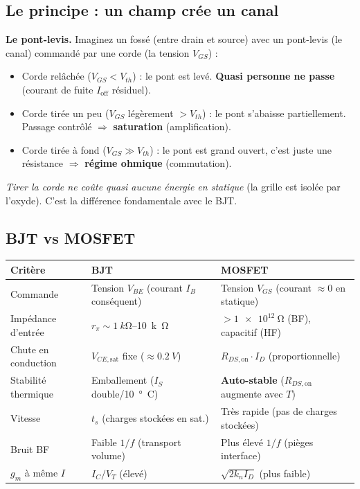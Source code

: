 \documentclass[12pt,a4paper,twoside]{book}
\begin{document}
\subsection{Le principe : un champ crée un canal}

\begin{analogie}
\textbf{Le pont-levis.} Imaginez un fossé (entre drain et source) avec un pont-levis (le canal) commandé par une corde (la tension $V_{GS}$) :
\begin{itemize}[nosep]
\item Corde relâchée ($V_{GS} < V_{th}$) : le pont est levé. \textbf{Quasi personne ne passe} (courant de fuite $I_{\text{off}}$ résiduel).
\item Corde tirée un peu ($V_{GS}$ légèrement $> V_{th}$) : le pont s'abaisse partiellement. Passage contrôlé $\Rightarrow$ \textbf{saturation} (amplification).
\item Corde tirée à fond ($V_{GS} \gg V_{th}$) : le pont est grand ouvert, c'est juste une résistance $\Rightarrow$ \textbf{régime ohmique} (commutation).
\end{itemize}
\textit{Tirer la corde ne coûte quasi aucune énergie en statique} (la grille est isolée par l'oxyde). C'est la différence fondamentale avec le BJT.
\end{analogie}

\subsection{BJT vs MOSFET}

\begin{center}
\renewcommand{\arraystretch}{1.4}
\begin{tabular}{p{3.2cm}p{4.5cm}p{4.8cm}}
\toprule
\textbf{Critère} & \textbf{BJT} & \textbf{MOSFET} \\
\midrule
Commande & Tension $V_{BE}$ (courant $I_B$ conséquent) & Tension $V_{GS}$ (courant $\approx 0$ en statique) \\
Impédance d'entrée & $r_\pi \sim \SI{1}{k\ohm}$--\SI{10}{k\ohm} & $> \SI{1e12}{\ohm}$ (BF), capacitif (HF) \\
Chute en conduction & $V_{CE,\text{sat}}$ fixe ($\approx\SI{0.2}{V}$) & $R_{DS,\text{on}} \cdot I_D$ (proportionnelle) \\
Stabilité thermique & Emballement ($I_S$ double/\SI{10}{°C}) & \textbf{Auto-stable} ($R_{DS,\text{on}}$ augmente avec $T$) \\
Vitesse & $t_s$ (charges stockées en sat.) & Très rapide (pas de charges stockées) \\
Bruit BF & Faible $1/f$ (transport volume) & Plus élevé $1/f$ (pièges interface) \\
$g_m$ à même $I$ & $I_C/V_T$ (élevé) & $\sqrt{2k_nI_D}$ (plus faible) \\
\bottomrule
\end{tabular}
\end{center}
\end{document}
